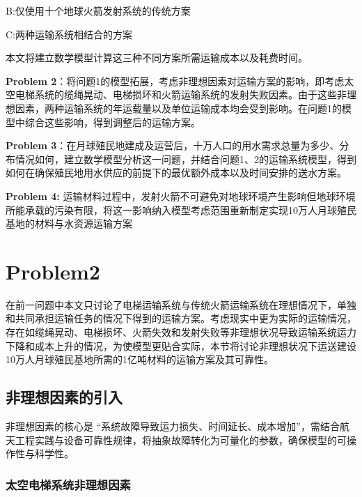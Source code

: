 B:仅使用十个地球火箭发射系统的传统方案

C:两种运输系统相结合的方案

本文将建立数学模型计算这三种不同方案所需运输成本以及耗费时间。

\textbf{Problem
2}：将问题1的模型拓展，考虑非理想因素对运输方案的影响，即考虑太空电梯系统的缆绳晃动、电梯损坏和火箭运输系统的发射失败因素。由于这些非理想因素，两种运输系统的年运载量以及单位运输成本均会受到影响。在问题1的模型中综合这些影响，得到调整后的运输方案。

\textbf{Problem
3}：在月球殖民地建成及运营后，十万人口的用水需求总量为多少、分布情况如何，建立数学模型分析这一问题，并结合问题1、2的运输系统模型，得到如何在确保殖民地用水供应的前提下的最优额外成本以及时间安排的送水方案。

\textbf{Problem 4:}
运输材料过程中，发射火箭不可避免对地球环境产生影响但地球环境所能承载的污染有限，将这一影响纳入模型考虑范围重新制定实现10万人月球殖民基地的材料与水资源运输方案

\hypertarget{problem2}{%
\section{Problem2}\label{problem2}}

在前一问题中本文只讨论了电梯运输系统与传统火箭运输系统在理想情况下，单独和共同承担运输任务的情况下得到的运输方案。考虑现实中更为实际的运输情况，存在如缆绳晃动、电梯损坏、火箭失效和发射失败等非理想状况导致运输系统运力下降和成本上升的情况，为使模型更贴合实际，本节将讨论非理想状况下运送建设10万人月球殖民基地所需的1亿吨材料的运输方案及其可靠性。

\hypertarget{ux975eux7406ux60f3ux56e0ux7d20ux7684ux5f15ux5165}{%
\subsection{非理想因素的引入}\label{ux975eux7406ux60f3ux56e0ux7d20ux7684ux5f15ux5165}}

非理想因素的核心是
``系统故障导致运力损失、时间延长、成本增加''，需结合航天工程实践与设备可靠性规律，将抽象故障转化为可量化的参数，确保模型的可操作性与科学性。

\hypertarget{ux592aux7a7aux7535ux68afux7cfbux7edfux975eux7406ux60f3ux56e0ux7d20}{%
\subsubsection{太空电梯系统非理想因素}\label{ux592aux7a7aux7535ux68afux7cfbux7edfux975eux7406ux60f3ux56e0ux7d20}}

